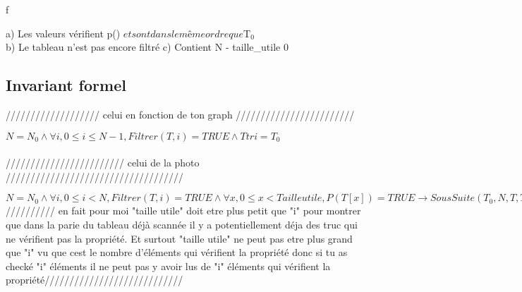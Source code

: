f\documentclass[a4paper, 11pt, oneside]{article}
\begin{document}
a) Les valeurs vérifient p(\cdot) $et sont dans le même ordre que $T$_{0}$\\
b) Le tableau n'est pas encore filtré
c) Contient N - taille\_utile 0 





\subsection{Invariant formel}

/////////////////// celui en fonction de ton graph ////////////////////////

$N = N_{0} \land \forall i, 0 \leq i \leq N-1, Filtrer(T, i) = TRUE \land T tri = T_{0}$ \\
\\
//////////////////////// celui de la  photo ////////////////////////////////////

$N = N_{0} \land \forall i, 0 \leq i<N, Filtrer(T,i) = TRUE \land
\forall x, 0 \leq x<Taille utile, P(T[x]) = TRUE \rightarrow{} SousSuite(T_{0}, N, T, Taille utile),  \land
\forall y, Taille utile \leq y<i, P(T[y]) = FALSE \rightarrow{}T[y]=0 $
\\

////////// en fait pour moi "taille utile" doit etre plus petit que "i" pour montrer que dans la parie du tableau déjà scannée il y a potentiellement déja des truc qui ne vérifient pas la propriété. Et surtout "taille utile" ne peut pas etre plus grand que "i" vu que cest le nombre d'éléments qui vérifient la propriété donc si tu as checké "i" éléments il ne peut pas y avoir lus de "i" éléments qui vérifient la propriété////////////////////////////
\end{document}
